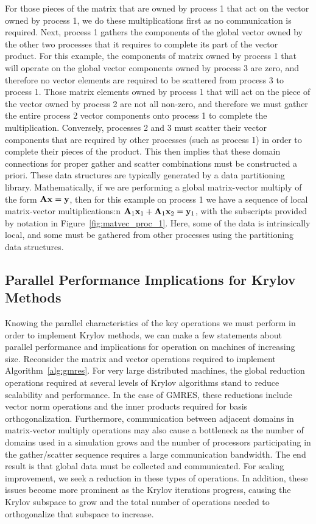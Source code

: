 For those pieces of the matrix that are owned by process 1 that act on
the vector owned by process 1, we do these multiplications first as no
communication is required. Next, process 1 gathers the components of
the global vector owned by the other two processes that it requires to
complete its part of the vector product. For this example, the
components of matrix owned by process 1 that will operate on the
global vector components owned by process 3 are zero, and therefore no
vector elements are required to be scattered from process 3 to process
1. Those matrix elements owned by process 1 that will act on the piece
of the vector owned by process 2 are not all non-zero, and therefore
we must gather the entire process 2 vector components onto process 1
to complete the multiplication.  Conversely, processes 2 and 3 must
scatter their vector components that are required by other processes
(such as process 1) in order to complete their pieces of the
product. This then implies that these domain connections for proper
gather and scatter combinations must be constructed a priori. These
data structures are typically generated by a data partitioning
library. Mathematically, if we are performing a global matrix-vector
multiply of the form $\mathbf{A}\mathbf{x} = \mathbf{y}$, then for this example on
process 1 we have a sequence of local matrix-vector multiplications:n
$\mathbf{A}_1\mathbf{x}_1 + \mathbf{A}_1\mathbf{x}_2 = \mathbf{y}_1$, with the subscripts
provided by notation in Figure~\ref{fig:matvec_proc_1}. Here, some of
the data is intrinsically local, and some must be gathered from other
processes using the partitioning data structures.

\subsection{Parallel Performance Implications for Krylov Methods}
\label{subsec:projection_method_performance}
Knowing the parallel characteristics of the key operations we must
perform in order to implement Krylov methods, we can make a few
statements about parallel performance and implications for operation
on machines of increasing size. Reconsider the matrix and vector
operations required to implement Algorithm~\ref{alg:gmres}. For very
large distributed machines, the global reduction operations required
at several levels of Krylov algorithms stand to reduce scalability and
performance. In the case of GMRES, these reductions include vector
norm operations and the inner products required for basis
orthogonalization. Furthermore, communication between adjacent domains
in matrix-vector multiply operations may also cause a bottleneck as
the number of domains used in a simulation grows and the number of
processors participating in the gather/scatter sequence requires a
large communication bandwidth. The end result is that global data must
be collected and communicated. For scaling improvement, we seek a
reduction in these types of operations. In addition, these issues
become more prominent as the Krylov iterations progress, causing the
Krylov subspace to grow and the total number of operations needed to
orthogonalize that subspace to increase.

